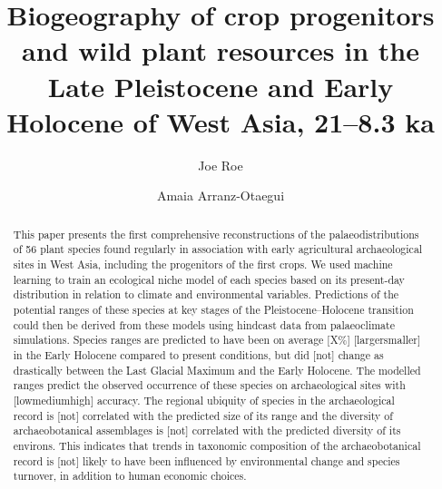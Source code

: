 \documentclass[
  authoryear,
  review]{elsarticle}
\begin{document}
\begin{frontmatter}
\title{Biogeography of crop progenitors and wild plant resources in the
Late Pleistocene and Early Holocene of West Asia, 21--8.3 ka}
\author[1,2]{Joe Roe%
%
}
\author[3]{Amaia Arranz-Otaegui%
%
}





        
\begin{abstract}
This paper presents the first comprehensive reconstructions of the
palaeodistributions of 56 plant species found regularly in association
with early agricultural archaeological sites in West Asia, including the
progenitors of the first crops. We used machine learning to train an
ecological niche model of each species based on its present-day
distribution in relation to climate and environmental variables.
Predictions of the potential ranges of these species at key stages of
the Pleistocene--Holocene transition could then be derived from these
models using hindcast data from palaeoclimate simulations. Species
ranges are predicted to have been on average {[}X\%{]}
{[}larger\textbar smaller{]} in the Early Holocene compared to present
conditions, but did {[}not{]} change as drastically between the Last
Glacial Maximum and the Early Holocene. The modelled ranges predict the
observed occurrence of these species on archaeological sites with
{[}low\textbar medium\textbar high{]} accuracy. The regional ubiquity of
species in the archaeological record is {[}not{]} correlated with the
predicted size of its range and the diversity of archaeobotanical
assemblages is {[}not{]} correlated with the predicted diversity of its
environs. This indicates that trends in taxonomic composition of the
archaeobotanical record is {[}not{]} likely to have been influenced by
environmental change and species turnover, in addition to human economic
choices.
\end{abstract}





\end{frontmatter}
    
\end{document}
